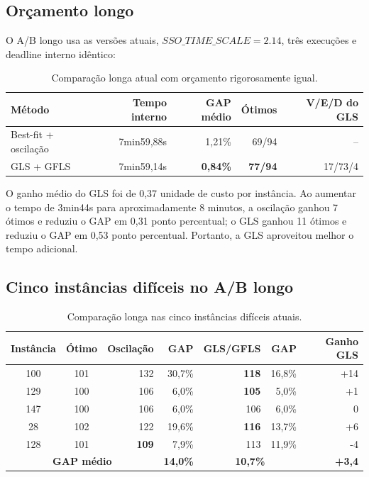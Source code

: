 \documentclass{article}
\begin{document}
\subsection{Orçamento longo}

O A/B longo usa as versões atuais, $SSO\_TIME\_SCALE=2.14$, três execuções e
deadline interno idêntico:

\begin{table}[H]
\centering
\begin{tabular}{lrrrr}
\toprule
Método & Tempo interno & GAP médio & Ótimos & V/E/D do GLS \\
\midrule
Best-fit + oscilação & 7min59,88s & 1,21\% & 69/94 & -- \\
GLS + GFLS           & 7min59,14s & \textbf{0,84\%} & \textbf{77/94} & 17/73/4 \\
\bottomrule
\end{tabular}
\caption{Comparação longa atual com orçamento rigorosamente igual.}
\end{table}

O ganho médio do GLS foi de 0,37 unidade de custo por instância. Ao aumentar o
tempo de 3min44s para aproximadamente 8 minutos, a oscilação ganhou 7 ótimos e
reduziu o GAP em 0,31 ponto percentual; o GLS ganhou 11 ótimos e reduziu o GAP
em 0,53 ponto percentual. Portanto, a GLS aproveitou melhor o tempo adicional.

\subsection{Cinco instâncias difíceis no A/B longo}

\begin{table}[H]
\centering
\begin{tabular}{ccrrrrr}
\toprule
Instância & Ótimo & Oscilação & GAP & GLS/GFLS & GAP & Ganho GLS \\
\midrule
100 & 101 & 132 & 30,7\% & \textbf{118} & 16,8\% & +14 \\
129 & 100 & 106 &  6,0\% & \textbf{105} &  5,0\% &  +1 \\
147 & 100 & 106 &  6,0\% & 106          &  6,0\% &   0 \\
28  & 102 & 122 & 19,6\% & \textbf{116} & 13,7\% &  +6 \\
128 & 101 & \textbf{109} & 7,9\% & 113      & 11,9\% &  -4 \\
\midrule
\multicolumn{3}{c}{\textbf{GAP médio}} & \textbf{14,0\%} &
\multicolumn{2}{c}{\textbf{10,7\%}} & \textbf{+3,4} \\
\bottomrule
\end{tabular}
\caption{Comparação longa nas cinco instâncias difíceis atuais.}
\end{table}
\end{document}
